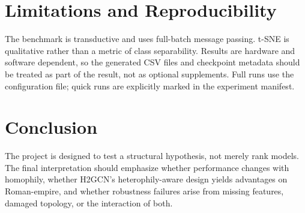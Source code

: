 \documentclass[11pt]{article}
\begin{document}
\section{Limitations and Reproducibility}
The benchmark is transductive and uses full-batch message passing. t-SNE is qualitative rather than a metric of class separability. Results are hardware and software dependent, so the generated CSV files and checkpoint metadata should be treated as part of the result, not as optional supplements. Full runs use the configuration file; quick runs are explicitly marked in the experiment manifest.
\section{Conclusion}
The project is designed to test a structural hypothesis, not merely rank models. The final interpretation should emphasize whether performance changes with homophily, whether H2GCN's heterophily-aware design yields advantages on Roman-empire, and whether robustness failures arise from missing features, damaged topology, or the interaction of both.
\end{document}
